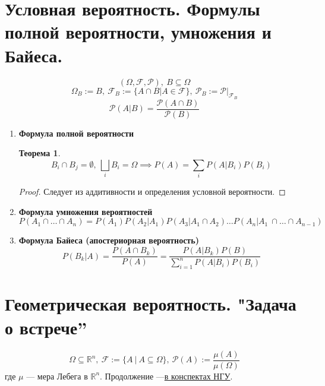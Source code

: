 \documentclass[11pt,a4paper]{report}
\def\salg{\mathcal{F}}
\def\prob{\mathcal{P}}
\theoremstyle{definition}
\theoremstyle{definition}
\newtheorem{theorem}{Теорема}[section]
\theoremstyle{definition}
\begin{document}
	\section{Условная вероятность. Формулы полной вероятности, умножения и Байеса.}
		\[ (\Omega, \salg, \prob),\ B \subseteq \Omega\]
		\[ \Omega_{B} := B,\ \salg_{B} := \{A \cap B | A \in \salg\},\ \prob_{B} := \prob|_{\salg_{B}}\]
		\[\prob(A | B) = \frac{\prob(A \cap B)}{\prob(B)} \]
	    \begin{enumerate}[1.]
	    \item \textbf{Формула полной вероятности}
		   \begin{theorem}
			   	\[ B_{i} \cap B_{j} = \emptyset,\ \bigsqcup_{i} B_{i} = \Omega \implies P(A) = \sum_{i} P(A | B_{i}) 	P(B_{i}) \]
		   \end{theorem}
		   \begin{proof}
			   	Следует из аддитивности и определения условной вероятности.
		   \end{proof}
		\item \textbf{Формула умножения вероятностей}
			\[P(A_{1} \cap \dots \cap A_{n}) = P(A_{1}) P(A_{2} | A_{1}) P (A_{3} | A_{1} \cap A_{2}) \dots P(A_{n} | A_{1} \ \cap \dots \cap A_{n-1}) \]
		\item \textbf{Формула Байеса (апостериорная вероятность)}
			\[P(B_{k} | A) = \frac{P(A \cap B_{k})}{P(A)} = \frac{P(A | B_{k}) P (B)}{\sum_{i=1}^{n}{P(A|B_{i})P(B_{i})}} \]
		\end{enumerate}
	\section{Геометрическая вероятность. "Задача о встрече”}
		\[ \Omega \subseteq \mathbb{R}^{n},\ \salg := \{A\ |\ A \subseteq \Omega \},\ \prob(A) := \frac{\mu(A)}{\mu(\Omega)}\] где $ \mu $ — мера Лебега в $ \mathbb{R}^{n} $.
		Продолжение —\href{http://www.nsu.ru/mmf/tvims/chernova/tv/lec/node6.html}{в конспектах НГУ}.
\end{document}
